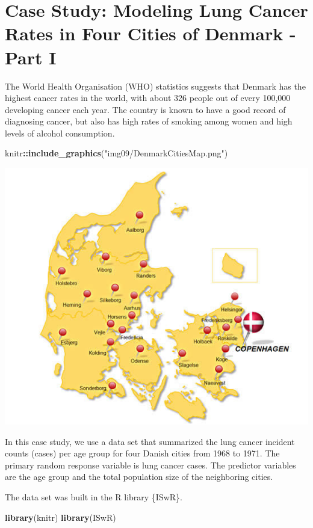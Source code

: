 \documentclass[
]{book}
\newenvironment{Shaded}{\begin{snugshade}}{\end{snugshade}}
\newcommand{\FunctionTok}[1]{\textcolor[rgb]{0.13,0.29,0.53}{\textbf{#1}}}
\newcommand{\NormalTok}[1]{#1}
\newcommand{\SpecialCharTok}[1]{\textcolor[rgb]{0.81,0.36,0.00}{\textbf{#1}}}
\newcommand{\StringTok}[1]{\textcolor[rgb]{0.31,0.60,0.02}{#1}}
\begin{document}
\hfill\break

\hypertarget{case-study-modeling-lung-cancer-rates-in-four-cities-of-denmark---part-i}{%
\section{Case Study: Modeling Lung Cancer Rates in Four Cities of Denmark - Part I}\label{case-study-modeling-lung-cancer-rates-in-four-cities-of-denmark---part-i}}

The World Health Organisation (WHO) statistics suggests that Denmark has the highest cancer rates in the world, with about 326 people out of every 100,000 developing cancer each year. The country is known to have a good record of diagnosing cancer, but also has high rates of smoking among women and high levels of alcohol consumption.

\begin{Shaded}
\begin{Highlighting}[]
\NormalTok{knitr}\SpecialCharTok{::}\FunctionTok{include\_graphics}\NormalTok{(}\StringTok{"img09/DenmarkCitiesMap.png"}\NormalTok{)}
\end{Highlighting}
\end{Shaded}

\begin{center}\includegraphics[width=0.6\linewidth]{img09/DenmarkCitiesMap} \end{center}

In this case study, we use a data set that summarized the lung cancer incident counts (cases) per age group for four Danish cities from 1968 to 1971. The primary random response variable is lung cancer cases. The predictor variables are the age group and the total population size of the neighboring cities.

The data set was built in the R library \{ISwR\}.

\begin{Shaded}
\begin{Highlighting}[]
\FunctionTok{library}\NormalTok{(knitr)}
\FunctionTok{library}\NormalTok{(ISwR)}
\end{Highlighting}
\end{Shaded}
\end{document}
